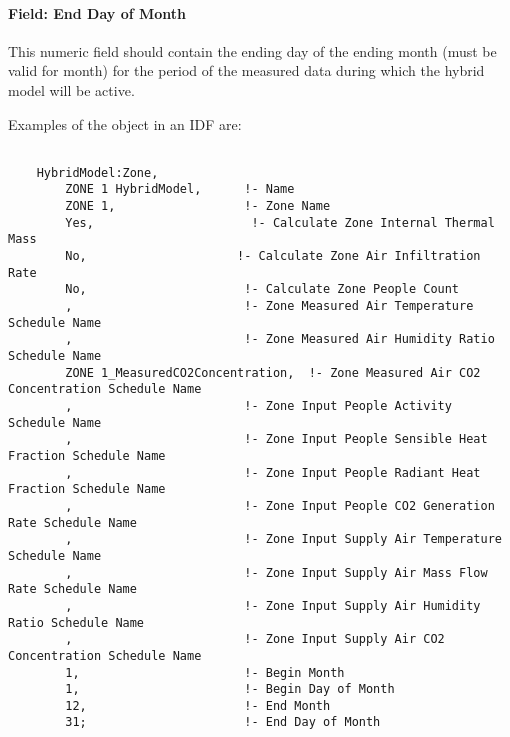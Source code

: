 \paragraph{Field: End Day of Month}\label{field-end-day-of-month-hm}
This numeric field should contain the ending day of the ending month (must be valid for month) for the period of the measured data during which the hybrid model will be active.

Examples of the object in an IDF are:

\begin{lstlisting}
    
    HybridModel:Zone,
        ZONE 1 HybridModel,      !- Name
        ZONE 1,                  !- Zone Name
        Yes,                      !- Calculate Zone Internal Thermal Mass
        No,                     !- Calculate Zone Air Infiltration Rate
        No,                      !- Calculate Zone People Count
        ,                        !- Zone Measured Air Temperature Schedule Name
        ,                        !- Zone Measured Air Humidity Ratio Schedule Name
        ZONE 1_MeasuredCO2Concentration,  !- Zone Measured Air CO2 Concentration Schedule Name
        ,                        !- Zone Input People Activity Schedule Name
        ,                        !- Zone Input People Sensible Heat Fraction Schedule Name
        ,                        !- Zone Input People Radiant Heat Fraction Schedule Name
        ,                        !- Zone Input People CO2 Generation Rate Schedule Name
        ,                        !- Zone Input Supply Air Temperature Schedule Name
        ,                        !- Zone Input Supply Air Mass Flow Rate Schedule Name
        ,                        !- Zone Input Supply Air Humidity Ratio Schedule Name
        ,                        !- Zone Input Supply Air CO2 Concentration Schedule Name
        1,                       !- Begin Month
        1,                       !- Begin Day of Month
        12,                      !- End Month
        31;                      !- End Day of Month



\end{lstlisting}
